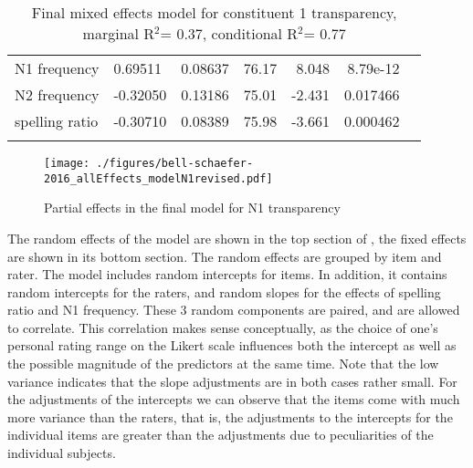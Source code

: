 \begin{table}[htb]
\begin{tabularx}{.95\textwidth}{llrrrrr}
N1 frequency           & 0.69511&   0.08637&76.17&  8.048&8.79e-12\\%
N2 frequency           &-0.32050&   0.13186&75.01& -2.431&0.017466\\%
spelling ratio       &-0.30710&   0.08389&75.98& -3.661&0.000462\\\lspbottomrule %
\end{tabularx}
\caption{Final mixed effects model for constituent 1 transparency, marginal R$^2$= 0.37, conditional R$^2$= 0.77}
\label{tab:bellschaefer2016mixed-revised-N1}

\end{table}
\begin{figure}[!htb]
  \centering
\texttt{[image: ./figures/bell-schaefer-2016\_allEffects\_modelN1revised.pdf]}
  \caption{Partial effects in the final model for N1 transparency}
\label{fig:bellschaefer2016_model_N1}
\end{figure}

The random effects of the model are shown in the top section of
, the fixed effects are
shown in its bottom section. The random effects are grouped by item
and rater. The model includes random intercepts for
items. In addition, it contains random intercepts for the raters, and random slopes for the
effects of spelling ratio and N1 frequency. These 3 random components
are paired, and are allowed to correlate. This correlation makes
sense conceptually, as the choice of one's personal rating range on
the Likert scale influences both the intercept as well as the possible
magnitude of the predictors at the same time. Note that the low variance
indicates that the slope adjustments are in both cases rather
small. For the adjustments of the intercepts we can observe that the
items come with much more variance than the raters, that is, the
adjustments to the intercepts for the individual items are greater
than the adjustments due to peculiarities of the individual subjects.  

